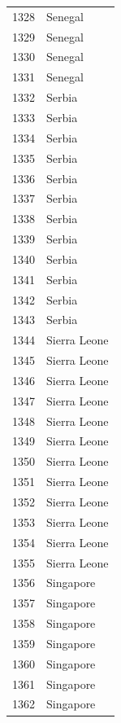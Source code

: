 \documentclass[
  letterpaper,
  DIV=11,
  numbers=noendperiod]{scrreprt}
\begin{document}
\begin{tabular}{ll}
1328 &                   Senegal \\
1329 &                   Senegal \\
1330 &                   Senegal \\
1331 &                   Senegal \\
1332 &                    Serbia \\
1333 &                    Serbia \\
1334 &                    Serbia \\
1335 &                    Serbia \\
1336 &                    Serbia \\
1337 &                    Serbia \\
1338 &                    Serbia \\
1339 &                    Serbia \\
1340 &                    Serbia \\
1341 &                    Serbia \\
1342 &                    Serbia \\
1343 &                    Serbia \\
1344 &              Sierra Leone \\
1345 &              Sierra Leone \\
1346 &              Sierra Leone \\
1347 &              Sierra Leone \\
1348 &              Sierra Leone \\
1349 &              Sierra Leone \\
1350 &              Sierra Leone \\
1351 &              Sierra Leone \\
1352 &              Sierra Leone \\
1353 &              Sierra Leone \\
1354 &              Sierra Leone \\
1355 &              Sierra Leone \\
1356 &                 Singapore \\
1357 &                 Singapore \\
1358 &                 Singapore \\
1359 &                 Singapore \\
1360 &                 Singapore \\
1361 &                 Singapore \\
1362 &                 Singapore \\

\end{tabular}
\end{document}
